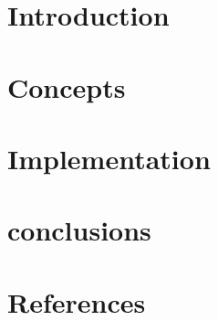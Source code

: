 \section[Intro]{Introduction}



\section[Con]{Concepts}



\section[Impl]{Implementation}


\section[End]{conclusions}


\section[Refs]{References}
